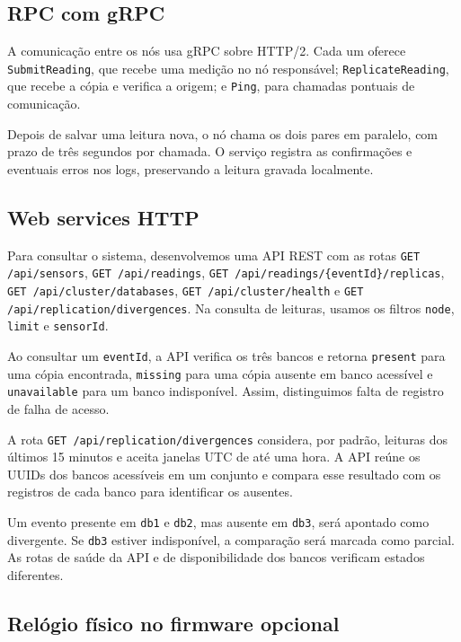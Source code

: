 \documentclass[12pt]{article}
\begin{document}
\subsection{RPC com gRPC}

A comunicação entre os nós usa gRPC sobre HTTP/2. Cada um oferece
\texttt{SubmitReading}, que recebe uma medição no nó responsável;
\texttt{ReplicateReading}, que recebe a cópia e verifica a origem; e
\texttt{Ping}, para chamadas pontuais de comunicação.

Depois de salvar uma leitura nova, o nó chama os dois pares em paralelo,
com prazo de três segundos por chamada. O serviço registra as confirmações
e eventuais erros nos logs, preservando a leitura gravada localmente.

\subsection{Web services HTTP}

Para consultar o sistema, desenvolvemos uma API REST com as rotas
\texttt{GET /api/sensors}, \texttt{GET /api/readings},
\texttt{GET /api/readings/\{eventId\}/replicas},
\texttt{GET /api/cluster/databases}, \texttt{GET /api/cluster/health} e
\texttt{GET /api/replication/divergences}. Na consulta de leituras, usamos
os filtros \texttt{node}, \texttt{limit} e \texttt{sensorId}.

Ao consultar um \texttt{eventId}, a API verifica os três bancos e retorna
\texttt{present} para uma cópia encontrada, \texttt{missing} para uma cópia
ausente em banco acessível e \texttt{unavailable} para um banco indisponível.
Assim, distinguimos falta de registro de falha de acesso.

A rota \texttt{GET /api/replication/divergences} considera, por padrão,
leituras dos últimos 15 minutos e aceita janelas UTC de até uma hora.
A API reúne os UUIDs dos bancos acessíveis em um conjunto e compara esse
resultado com os registros de cada banco para identificar os ausentes.

Um evento presente em \texttt{db1} e \texttt{db2}, mas ausente em
\texttt{db3}, será apontado como divergente. Se \texttt{db3} estiver
indisponível, a comparação será marcada como parcial. As rotas de saúde
da API e de disponibilidade dos bancos verificam estados diferentes.

\subsection{Relógio físico no firmware opcional}
\end{document}
